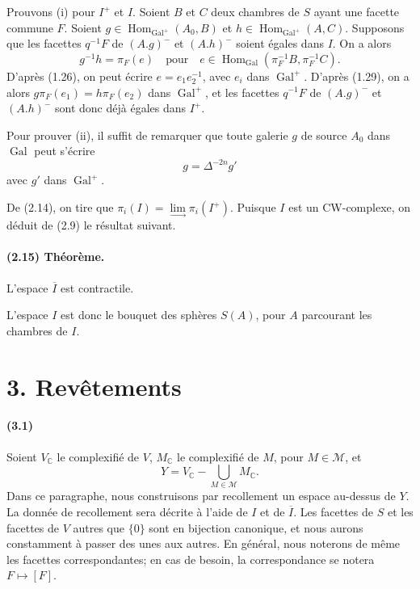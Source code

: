 \documentclass[10pt]{article}
\newcommand{\C}{\mathbb C}
\providecommand{\varinjlim}{\mathop{\mathrm{lim}}\limits_{\longrightarrow}}
\begin{document}
Prouvons (i) pour \(I^+\) et \(I\). Soient \(B\) et \(C\) deux chambres de \(S\) ayant une facette commune \(F\). Soient \(g\in\operatorname{Hom}_{\operatorname{Gal}^+}(A_0,B)\) et \(h\in\operatorname{Hom}_{\operatorname{Gal}^+}(A,C)\). Supposons que les facettes \(q^{-1}F\) de \((A.g)^{-}\) et \((A.h)^{-}\) soient égales dans \(I\). On a alors
\[
g^{-1}h=\pi_F(e)
\quad\text{pour}\quad
e\in\operatorname{Hom}_{\operatorname{Gal}}(\pi_F^{-1}B,\pi_F^{-1}C).
\]
D'après (1.26), on peut écrire \(e=e_1e_2^{-1}\), avec \(e_i\) dans \(\operatorname{Gal}^+\). D'après (1.29), on a alors \(g\pi_F(e_1)=h\pi_F(e_2)\) dans \(\operatorname{Gal}^+\), et les facettes \(q^{-1}F\) de \((A.g)^{-}\) et \((A.h)^{-}\) sont donc déjà égales dans \(I^+\).

Pour prouver (ii), il suffit de remarquer que toute galerie \(g\) de source \(A_0\) dans \(\operatorname{Gal}\) peut s'écrire
\[
g=\Delta^{-2n}g'
\]
avec \(g'\) dans \(\operatorname{Gal}^+\).

De (2.14), on tire que \(\pi_i(I)=\varinjlim\pi_i(I^+)\). Puisque \(I\) est un CW-complexe, on déduit de (2.9) le résultat suivant.

\paragraph{(2.15) Théorème.} L'espace \(\overline I\) est contractile.

L'espace \(I\) est donc le bouquet des sphères \(S(A)\), pour \(A\) parcourant les chambres de \(I\).

\section*{3. Revêtements}

\paragraph{(3.1)} Soient \(V_\C\) le complexifié de \(V\), \(M_\C\) le complexifié de \(M\), pour \(M\in\mathcal M\), et
\[
Y=V_\C-\bigcup_{M\in\mathcal M}M_\C.
\]
Dans ce paragraphe, nous construisons par recollement un espace au-dessus de \(Y\). La donnée de recollement sera décrite à l'aide de \(I\) et de \(\overline I\). Les facettes de \(S\) et les facettes de \(V\) autres que \(\{0\}\) sont en bijection canonique, et nous aurons constamment à passer des unes aux autres. En général, nous noterons de même les facettes correspondantes; en cas de besoin, la correspondance se notera \(F\mapsto [F]\).
\end{document}

